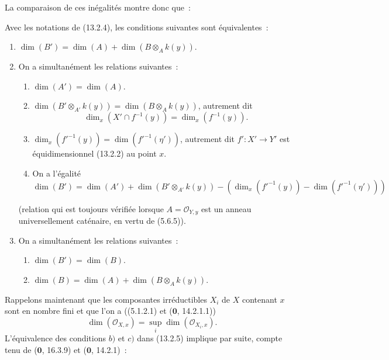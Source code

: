 La comparaison de ces inégalités montre donc que~:

\begin{lemma}[13.2.5]
\label{IV.13.2.5-fr}
Avec les notations de (13.2.4), les conditions suivantes sont équivalentes~:
\begin{enumerate}[label=\emph{\alph*)}]
  \item $\dim(B')=\dim(A)+\dim(B\otimes_Ak(y))$.
  \item On a simultanément les relations suivantes~:
  \begin{enumerate}[label=(\roman*)]
    \item $\dim(A')=\dim(A)$.
    \item $\dim(B'\otimes_{A'}k(y))=\dim(B\otimes_Ak(y))$, autrement dit
    \[
      \dim_x(X'\cap f^{-1}(y))=\dim_x(f^{-1}(y)).
    \]
    \item $\dim_x(f'^{-1}(y))=\dim(f'^{-1}(\eta'))$, autrement dit
    $f':X'\to Y'$ est équidimensionnel (13.2.2) au point $x$.
    \item On a l'égalité
    \[
      \dim(B')=\dim(A')+\dim(B'\otimes_{A'}k(y))
      -(\dim_x(f'^{-1}(y))-\dim(f'^{-1}(\eta')))
    \]
  \end{enumerate}
  (relation qui est toujours vérifiée lorsque $A=\mathcal O_{Y,y}$ est un
  anneau universellement caténaire, en vertu de (5.6.5)).
  \item On a simultanément les relations suivantes~:
  \begin{enumerate}[label=(\roman*)]
    \item $\dim(B')=\dim(B)$.
    \item $\dim(B)=\dim(A)+\dim(B\otimes_Ak(y))$.
  \end{enumerate}
\end{enumerate}
\end{lemma}

\begin{env}[13.2.6]
\label{IV.13.2.6-fr}
Rappelons maintenant que les composantes irréductibles $X_i$ de $X$ contenant
$x$ sont en nombre fini et que l'on a ((5.1.2.1) et ($\mathbf 0$, 14.2.1.1))
\[
\tag{13.2.6.1}
\label{IV.13.2.6.1-fr}
  \dim(\mathcal O_{X,x})=\sup_i\dim(\mathcal O_{X_i,x}).
\]
L'équivalence des conditions $b)$ et $c)$ dans (13.2.5) implique par suite,
compte tenu de ($\mathbf 0$, 16.3.9) et ($\mathbf 0$, 14.2.1)~:
\end{env}

